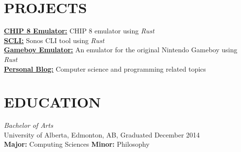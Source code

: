 \documentclass[margin, 9pt]{res} %
\begin{document}
\begin{resume}
\section{PROJECTS}
\href{https://github.com/adamrmelnyk/chip_8_emulator}{\bf CHIP 8 Emulator:} CHIP 8 emulator using {\it Rust} \\
\href{https://github.com/adamrmelnyk/scli}{\bf SCLI:} Sonos CLI tool using {\it Rust} \\
\href{https://github.com/adamrmelnyk/oxide\_boy}{\bf Gameboy Emulator:} An emulator for the original Nintendo Gameboy using {\it Rust} \\
\href{https://arm64.ca}{\bf Personal Blog:} Computer science and programming related topics



\section{EDUCATION}

{\sl Bachelor of Arts}\\
University of Alberta, Edmonton, AB, Graduated December 2014 \\
{\bf Major:} Computing Sciences {\bf Minor:} Philosophy

\end{resume}
\end{document}
